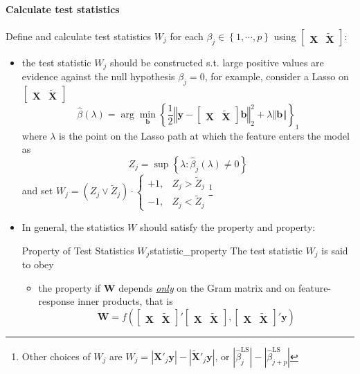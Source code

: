 \documentclass[twoside]{article}
\begin{document}
\paragraph{Calculate test statistics} Define and calculate test statistics $W_j$ for each $\beta_j\in\left\{ 1,\cdots,p \right\}$ using $\begin{bmatrix} \mathbf{X} & \tilde{\mathbf{X}} \end{bmatrix}$:
\begin{itemize}
    \item the test statistic $W_j$ should be constructed s.t. large positive values are evidence against the null hypothesis $\beta_j =0$, for example, consider a Lasso on $\begin{bmatrix} \mathbf{X} & \tilde{\mathbf{X}} \end{bmatrix}$ $$ \hat{\beta}(\lambda) = \arg\min_{\mathbf{b}}\left\{ \frac{1}{2}\left\Vert \mathbf{y}-\begin{bmatrix} \mathbf{X} & \tilde{\mathbf{X}} \end{bmatrix} \mathbf{b} \right\Vert^2_2 + \lambda\left\Vert \mathbf{b} \right\Vert \right\} _1 $$ where $\lambda$ is the point on the Lasso path at which the feature enters the model as $$ Z_j = \sup \left\{ \lambda: \hat{\beta}_j(\lambda)\neq 0 \right\} $$ and set $W_j = (Z_j \vee \tilde{Z}_j)\cdot \begin{cases} +1, &Z_j>\tilde{Z}_j \\ -1, & Z_j<\tilde{Z}_j \end{cases}$\footnote{Other choices of $W_j$ are $W_j =\left\vert\mathbf{X}'_j\mathbf{y} \right\vert - \left\vert\tilde{\mathbf{X}}'_j\mathbf{y} \right\vert $, or $\left\vert \hat{\beta}^{\mathrm{LS}}_j \right\vert-\left\vert \hat{\beta}^{\mathrm{LS}}_{j+p} \right\vert$} 
    \item In general, the statistics $W$ should satisfy the  property and  property:
    \begin{definition}{Property of Test Statistics $W_j$}{statistic_property}
        The test statistic $W_j$ is said to obey
        \begin{itemize}
            \item the  property if $\mathbf{W}$ depends \underline{\textit{only}} on the Gram matrix and on feature-response inner products, that is $$ \mathbf{W} = f\left( \begin{bmatrix} \mathbf{X} & \tilde{\mathbf{X}} \end{bmatrix}'\begin{bmatrix} \mathbf{X} & \tilde{\mathbf{X}} \end{bmatrix},\begin{bmatrix} \mathbf{X} & \tilde{\mathbf{X}} \end{bmatrix}'\mathbf{y} \right) $$

\end{itemize}
\end{definition}
\end{itemize}
\end{document}
